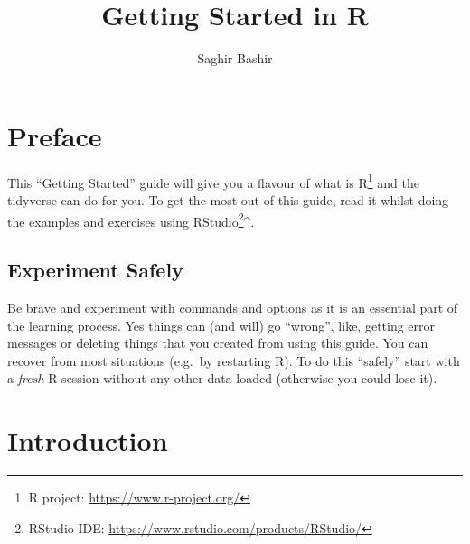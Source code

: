 \documentclass[a4paper,9pt,twocolumn,twoside,printwatermark=false]{pinp}
\title{Getting Started in R}
\author[]{Saghir Bashir}
\begin{document}
\verticaladjustment{-2pt}

\maketitle
\thispagestyle{firststyle}



\section{Preface}\label{preface}

This ``Getting Started'' guide will give you a flavour of what is
R\footnote{R project: \url{https://www.r-project.org/}} and the
tidyverse can do for you. To get the most out of this guide, read it
whilst doing the examples and exercises using RStudio\footnote{RStudio
  IDE: \url{https://www.rstudio.com/products/RStudio/}}\^{}.

\subsection{Experiment Safely}\label{experiment-safely}

Be brave and experiment with commands and options as it is an essential
part of the learning process. Yes things can (and will) go ``wrong'',
like, getting error messages or deleting things that you created from
using this guide. You can recover from most situations (e.g.~by
restarting R). To do this ``safely'' start with a \emph{fresh} R session
without any other data loaded (otherwise you could lose it).

\section{Introduction}\label{introduction}
\end{document}
